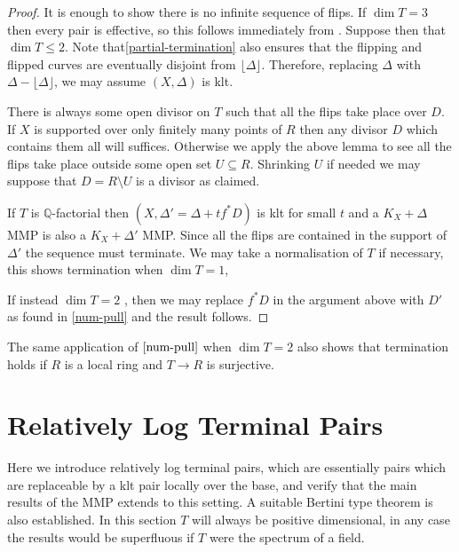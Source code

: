 \documentclass[a4paper,12pt]{amsart}
\begin{document}
	\begin{proof}
				
		It is enough to show there is no infinite sequence of flips. If $\dim T=3$ then every pair is effective, so this follows immediately from \cite[Theorem F]{bhatt2020globally+}. Suppose then that $\dim T \leq 2$. Note that\autoref{partial-termination} also ensures that the flipping and flipped curves are eventually disjoint from $\lfloor \Delta \rfloor$. Therefore, replacing $\Delta$ with $\Delta-\lfloor \Delta \rfloor$, we may assume $(X,\Delta)$ is klt.
		
		There is always some open divisor on $T$ such that all the flips take place over $D$. If $X$ is supported over only finitely many points of $R$ then any divisor $D$ which contains them all will suffices. Otherwise we apply the above lemma to see all the flips take place outside some open set $U \subseteq R$. Shrinking $U$ if needed we may suppose that $D=R \setminus U$ is a divisor as claimed.

		If $T$ is $\mathbb{Q}$-factorial then $(X,\Delta'=\Delta+tf^{*}D)$ is klt for small $t$ and a $K_{X}+\Delta$ MMP is also a $K_{X}+\Delta'$ MMP. Since all the flips are contained in the support of $\Delta'$ the sequence must terminate. We may take a normalisation of $T$ if necessary, this shows termination when $\dim T=1$,
		
		If instead $\dim T =2$ , then we may replace $f^{*}D$ in the argument above with $D'$ as found in \autoref{num-pull} and the result follows.
		
	\end{proof}

	\begin{remark}
		
		The same application of $\autoref{num-pull}$ when $\dim T=2$ also shows that termination holds if $R$ is a local ring and $T \to R$ is surjective.
		
		\end{remark}
	
	
	
	\section{Relatively Log Terminal Pairs} \label{rlt-section}


	Here we introduce relatively log terminal pairs, which are essentially pairs which are replaceable by a klt pair locally over the base, and verify that the main results of the MMP extends to this setting. A suitable Bertini type theorem is also established. In this section $T$ will always be positive dimensional, in any case the results would be superfluous if $T$ were the spectrum of a field.
	
\end{document}
